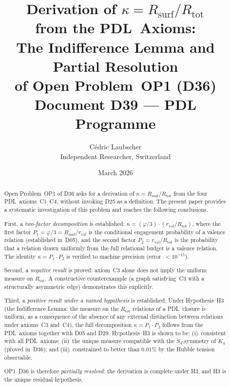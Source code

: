 \documentclass[11pt,a4paper]{article}
\theoremstyle{definition}
\newcommand{\PDL}{\textnormal{PDL}}
\newcommand{\Kfour}{K_4}
\newcommand{\rval}{r_{\mathrm{val}}}
\newcommand{\Rtot}{R_{\mathrm{tot}}}
\newcommand{\Rsurf}{R_{\mathrm{surf}}}
\newcommand{\vp}{\varphi}
\newcommand{\kap}{\kappa}
\begin{document}
\title{\textbf{Derivation of $\kappa = R_{\mathrm{surf}}/R_{\mathrm{tot}}$\\
from the \PDL\ Axioms:\\
The Indifference Lemma and Partial Resolution\\
of Open Problem~OP1 (D36)}\\[4pt]
\large Document D39 --- PDL Programme}
\author{C\'edric Laubscher\\
\small Independent Researcher, Switzerland}
\date{March 2026}

\maketitle

\begin{abstract}
Open Problem~OP1 of D36 asks for a derivation of $\kap = \Rsurf/\Rtot$
from the four \PDL\ axioms~C1--C4, without invoking D25 as a definition.
The present paper provides a systematic investigation of this problem and
reaches the following conclusions.

First, a \emph{two-factor decomposition} is established:
$\kap = (\vp/3)\cdot(\rval/\Rtot)$, where the first factor
$P_1 = \vp/3 = \Rsurf/\rval$ is the conditional engagement probability
of a valence relation (established in~D05), and the second factor
$P_2 = \rval/\Rtot$ is the probability that a relation drawn uniformly
from the full relational budget is a valence relation. The identity
$\kap = P_1 \cdot P_2$ is verified to machine precision
(error~$< 10^{-15}$).

Second, a \emph{negative result} is proved: axiom~C3 alone does not
imply the uniform measure on $\Rtot$. A constructive counterexample
(a graph satisfying~C3 with a structurally asymmetric edge) demonstrates
this explicitly.

Third, a \emph{positive result under a named hypothesis} is established.
Under Hypothesis~H3 (the Indifference Lemma: the measure on the
$\Rtot$ relations of a \PDL\ closure is uniform, as a consequence
of the absence of any external distinction between relations under
axioms~C3 and~C4), the full decomposition $\kap = P_1 \cdot P_2$
follows from the \PDL\ axioms together with D05 and D29.
Hypothesis~H3 is shown to be: (i)~consistent with all \PDL\ axioms;
(ii)~the unique measure compatible with the $S_4$-symmetry of $\Kfour$
(proved in~D36); and (iii)~constrained to better than $0.01\%$ by the
Hubble tension observable.

OP1~D36 is therefore \emph{partially resolved}: the derivation is
complete under H3, and H3 is the unique residual hypothesis.
\end{abstract}
\end{document}
